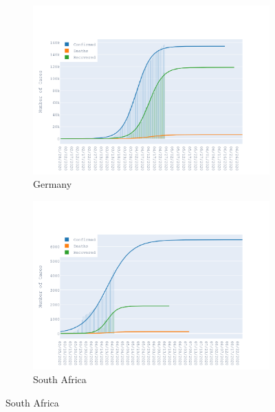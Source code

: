 \documentclass{homework}
\begin{document}
\begin{figure}[H]
  \begin{subfigure}{0.45\linewidth}
    \includegraphics[width=\linewidth]{task2/Germany.png}
    \caption{Germany}
  \end{subfigure}
  \hfil
  \begin{subfigure}{0.45\linewidth}
    \includegraphics[width=\linewidth]{task2/South Africa.png}
    \caption{South Africa}
  \end{subfigure}


\end{figure}
\end{document}
